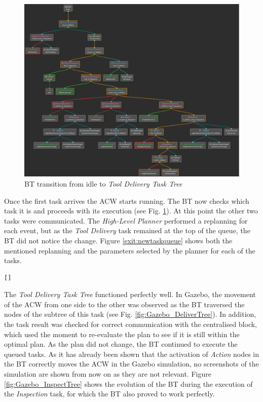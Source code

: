 \begin{figure}[htbp]
    \centering
    \includegraphics[width=.75\linewidth]{Results/figures/BTnoIdle.pdf}
    \caption{\gls{BT} transition from idle to \emph{Tool Delivery Task Tree}}
    \label{fig:NoIdle_DeliverToolTaskTree}
\end{figure}

Once the first task arrives the \gls{ACW} starts running. The \gls{BT} now checks which task it is and proceeds with its execution (see Fig. \ref{fig:NoIdle_DeliverToolTaskTree}). At this point the other two tasks were communicated. The \emph{High-Level Planner} performed a replanning for each event, but as the \emph{Tool Delivery} task remained at the top of the queue, the \gls{BT} did not notice the change. Figure \ref{exit:newtaskqueue} shows both the mentioned replanning and the parameters selected by the planner for each of the tasks.

\begin{lstlisting}[caption={Feedback of the task planning process and communications between \emph{High-Level Planner} and \emph{Agent Behaviour Manager}}, breaklines=true, label=exit:newtaskqueue]
	[]
\end{lstlisting}

The \emph{Tool Delivery Task Tree} functioned perfectly well. In Gazebo, the movement of the \gls{ACW} from one side to the other was observed as the \gls{BT} traversed the nodes of the subtree of this task (see Fig. \ref{fig:Gazebo_DeliverTree}). In addition, the task result was checked for correct communication with the centralised block, which used the moment to re-evaluate the plan to see if it is still within the optimal plan. As the plan did not change, the \gls{BT} continued to execute the queued tasks. As it has already been shown that the activation of \emph{Action} nodes in the \gls{BT} correctly moves the \gls{ACW} in the Gazebo simulation, no screenshots of the simulation are shown from now on as they are not relevant. Figure \ref{fig:Gazebo_InspectTree} shows the evolution of the \gls{BT} during the execution of the \emph{Inspection} task, for which the \gls{BT} also proved to work perfectly. 

